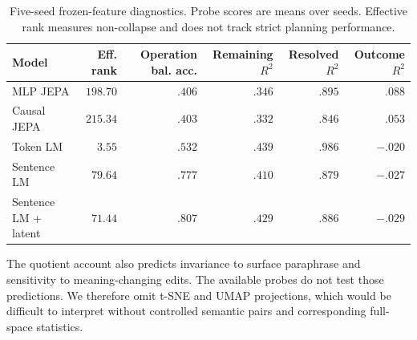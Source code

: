 \begin{table}[t]
\caption{Five-seed frozen-feature diagnostics. Probe scores are means over seeds. Effective rank measures non-collapse and does not track strict planning performance.}
\label{tab:probes-main}
\centering
\scriptsize
\begin{tabular}{lrrrrr}
\toprule
Model & Eff. rank & Operation bal. acc. & Remaining $R^2$ & Resolved $R^2$ & Outcome $R^2$ \\
\midrule
MLP JEPA & $198.70$ & $.406$ & $.346$ & $.895$ & $.088$ \\
Causal JEPA & $215.34$ & $.403$ & $.332$ & $.846$ & $.053$ \\
Token LM & $3.55$ & $.532$ & $.439$ & $.986$ & $-.020$ \\
Sentence LM & $79.64$ & $.777$ & $.410$ & $.879$ & $-.027$ \\
Sentence LM + latent & $71.44$ & $.807$ & $.429$ & $.886$ & $-.029$ \\
\bottomrule
\end{tabular}
\end{table}

The quotient account also predicts invariance to surface paraphrase and sensitivity to meaning-changing edits. The available probes do not test those predictions. We therefore omit t-SNE and UMAP projections, which would be difficult to interpret without controlled semantic pairs and corresponding full-space statistics.
